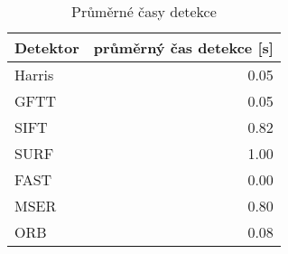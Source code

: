 \begin{table}[htbp]\centering
\begin{tabular}{ l| r }
	Detektor & průměrný čas detekce [s] \\
	\hline
	 Harris & 0.05 \\
	 GFTT & 0.05 \\
	 SIFT & 0.82 \\
	 SURF & 1.00 \\
	 FAST & 0.00 \\
	 MSER & 0.80 \\
	 ORB & 0.08
\end{tabular}
	\caption[Short Heading]{\protect Průměrné časy detekce}\label{tab_dettimes}
\end{table}